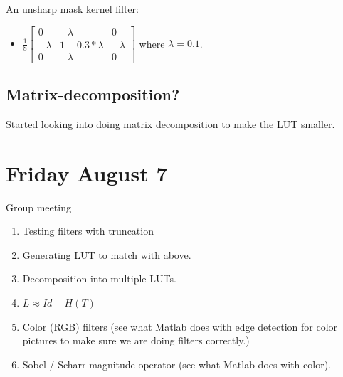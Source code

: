\documentclass[12pt]{amsart}
\theoremstyle{definition}
\theoremstyle{remark}
\numberwithin{thm}{section}
\begin{document}
An unsharp mask kernel filter:
\begin{itemize}
\item
$
\frac{1}{8}
\begin{bmatrix}
0 &-\lambda &0\\
-\lambda &1-0.3*\lambda &-\lambda\\
0 &-\lambda &0
\end{bmatrix}
$
where $\lambda=0.1$.
\end{itemize}

\subsection{Matrix-decomposition?}
Started looking into doing matrix decomposition to make the LUT smaller.


\section{Friday August 7}

Group meeting
\begin{enumerate}
\item Testing filters with truncation
\item Generating LUT to match with above.
\item Decomposition into multiple LUTs.
\item $L \approx Id - H(T)$
\item Color (RGB) filters (see what Matlab does with edge detection for color pictures to make sure we are doing filters correctly.)
\item Sobel / Scharr magnitude operator (see what Matlab does with color).
\end{enumerate}
\end{document}
